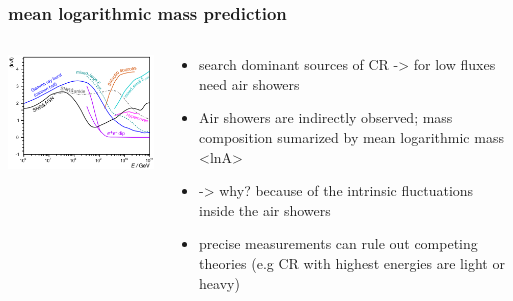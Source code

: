 \documentclass[aspectratio=1610, 9pt]{beamer}
\begin{document}
\begin{frame}\frametitle{mean logarithmic mass prediction}
  \begin{columns}
    \begin{column}[c]{0.48\textwidth}
      \includegraphics{lnA_left.png}
    \end{column}
    \begin{column}[c]{0.48\textwidth}
      \begin{itemize}
        \item search dominant sources of CR -> for low fluxes need air showers
        \item Air showers are indirectly observed; mass composition sumarized by
        mean logarithmic mass <lnA> %
        \item -> why? because of the intrinsic fluctuations inside the air showers
        \item precise measurements can rule out competing theories (e.g CR with
        highest energies are light or heavy)
      \end{itemize}
    \end{column}
  \end{columns}
\end{frame}
\end{document}
